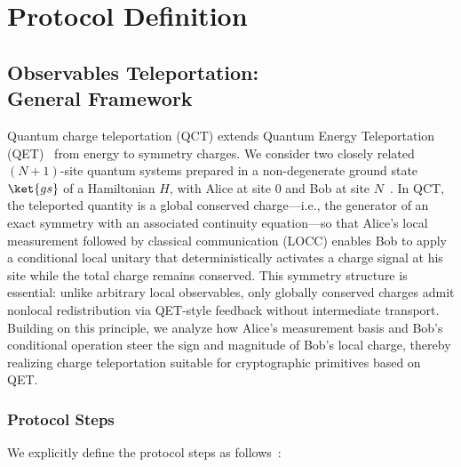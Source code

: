 \section{Protocol Definition}
\label{sec:protocol}

\subsection{Observables Teleportation:\texorpdfstring{\\}{line}General Framework}
\label{sec:generic_teleportation}

Quantum charge teleportation (QCT) extends Quantum Energy Teleportation (QET)~\cite{Hotta2011,Ikeda2023} from energy to symmetry charges. We consider two closely related $(N\!+\!1)$-site quantum systems prepared in a non-degenerate ground state $\ket{gs}$ of a Hamiltonian $H$, with Alice at site $0$ and Bob at site $N$~\cite{QKDbyQET,IkedaTeleportingCharge}. In QCT, the teleported quantity is a global conserved charge—i.e., the generator of an exact symmetry with an associated continuity equation—so that Alice’s local measurement followed by classical communication (LOCC) enables Bob to apply a conditional local unitary that deterministically activates a charge signal at his site while the total charge remains conserved. This symmetry structure is essential: unlike arbitrary local observables, only globally conserved charges admit nonlocal redistribution via QET-style feedback without intermediate transport. Building on this principle, we analyze how Alice’s measurement basis and Bob’s conditional operation steer the sign and magnitude of Bob’s local charge, thereby realizing charge teleportation suitable for cryptographic primitives based on QET.

\subsubsection{Protocol Steps}
We explicitly define the protocol steps as follows~\cite{QKDbyQET}:

